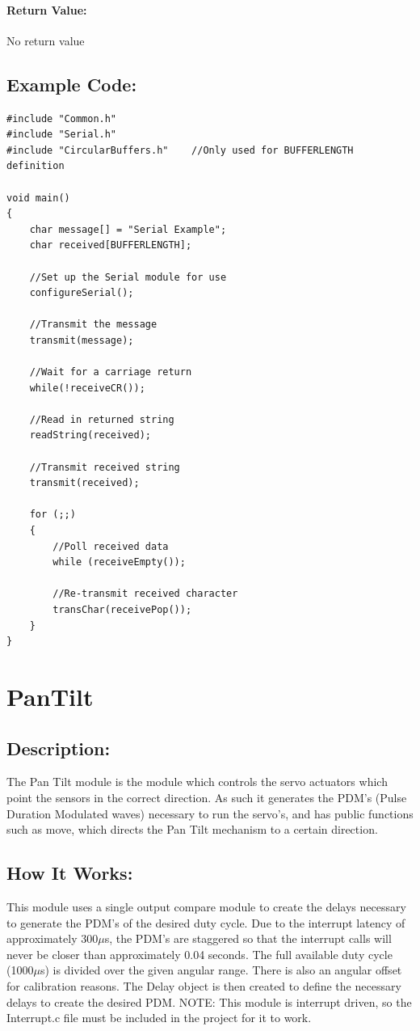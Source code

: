 \documentclass[]{report}
\begin{document}
\subsubsection{Return Value:}
No return value


\section{Example Code:}
\begin{lstlisting}
#include "Common.h"
#include "Serial.h"
#include "CircularBuffers.h"	//Only used for BUFFERLENGTH definition

void main()
{
	char message[] = "Serial Example";
	char received[BUFFERLENGTH];

	//Set up the Serial module for use
	configureSerial();
	
	//Transmit the message
	transmit(message);
	
	//Wait for a carriage return
	while(!receiveCR());
		
	//Read in returned string
	readString(received);
		
	//Transmit received string
	transmit(received);
	
	for (;;)
	{
		//Poll received data
		while (receiveEmpty());
		
		//Re-transmit received character
		transChar(receivePop());
	}
}
\end{lstlisting}

\chapter{PanTilt}
\section{Description:}
The Pan Tilt module is the module which controls the servo actuators which point the sensors in the correct direction. As such it generates the PDM's (Pulse Duration Modulated waves) necessary to run the servo's, and has public functions such as move, which directs the Pan Tilt mechanism to a certain direction.

\section{How It Works:}
This module uses a single output compare module to create the delays necessary to generate the PDM's of the desired duty cycle. Due to the interrupt latency of approximately 300$\mu$s, the PDM's are staggered so that the interrupt calls will never be closer than approximately 0.04 seconds. The full available duty cycle (1000$\mu$s) is divided over the given angular range. There is also an angular offset for calibration reasons. The Delay object is then created to define the necessary delays to create the desired PDM.
NOTE: This module is interrupt driven, so the Interrupt.c file must be included in the project for it to work.
\end{document}
